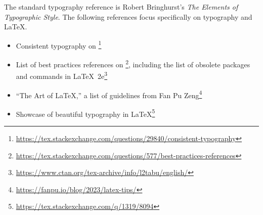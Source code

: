 The standard typography reference is Robert Bringhurst's \emph{The Elements of Typographic Style}. 
The following references focus specifically on typography and \LaTeX{}.
\begin{itemize}
    \item Consistent typography on \footnote{\url{https://tex.stackexchange.com/questions/29840/consistent-typography}}
    \item List of best practices references on \footnote{\url{https://tex.stackexchange.com/questions/577/best-practices-references}}, including the list of obsolete packages and commands in \LaTeX{}~2e\footnote{\url{https://www.ctan.org/tex-archive/info/l2tabu/english/}}
    \item ``The Art of \LaTeX{},'' a list of guidelines from Fan Pu Zeng\footnote{\url{https://fanpu.io/blog/2023/latex-tips/}}
    \item Showcase of beautiful typography in \LaTeX{}\footnote{\url{https://tex.stackexchange.com/q/1319/8094}}
\end{itemize}

